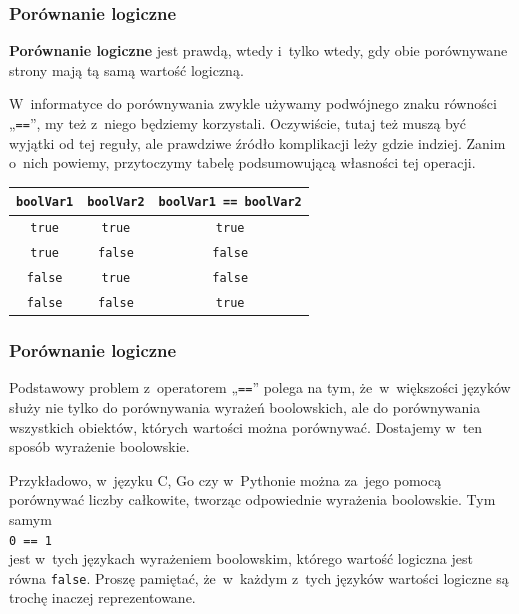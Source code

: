 \documentclass[10pt,t]{beamer}
\begin{document}
\begin{frame}
  \frametitle{Porównanie logiczne}


  \textbf{Porównanie logiczne} jest prawdą, wtedy i~tylko wtedy, gdy obie
  porównywane strony mają tą samą wartość logiczną.

  W~informatyce do porównywania zwykle używamy podwójnego znaku równości
  „\texttt{==}”, my też z~niego będziemy korzystali. Oczywiście, tutaj też
  muszą być wyjątki od tej reguły, ale prawdziwe źródło komplikacji
  leży gdzie indziej. Zanim o~nich powiemy, przytoczymy tabelę
  podsumowującą własności tej operacji.

  \vspace{1em}





  \begingroup

  \centering

  \begin{tabular}{|c|c|c|}
    \hline
    \texttt{boolVar1} & \texttt{boolVar2}
    & \texttt{boolVar1 == boolVar2} \\
    \hline
    \texttt{true}  & \texttt{true}  & \texttt{true}  \\
    \texttt{true}  & \texttt{false} & \texttt{false} \\
    \texttt{false} & \texttt{true}  & \texttt{false} \\
    \texttt{false} & \texttt{false} & \texttt{true}  \\
    \hline
  \end{tabular}

  \endgroup

\end{frame}





\begin{frame}
  \frametitle{Porównanie logiczne}


  Podstawowy problem z~operatorem „\texttt{==}” polega na tym,
  że~w~większości języków służy nie tylko do porównywania wyrażeń
  boolowskich, ale do porównywania wszystkich obiektów, których wartości
  można porównywać. Dostajemy w~ten sposób wyrażenie boolowskie.

  Przykładowo, w~języku C, Go czy w~Pythonie można za~jego pomocą
  porównywać liczby całkowite, tworząc odpowiednie wyrażenia boolowskie.
  Tym samym \\
  \texttt{0 == 1} \\
  jest w~tych językach wyrażeniem boolowskim, którego wartość logiczna jest
  równa \texttt{false}. Proszę pamiętać, że~w~każdym z~tych języków
  wartości logiczne są trochę inaczej reprezentowane.

\end{frame}
\end{document}
